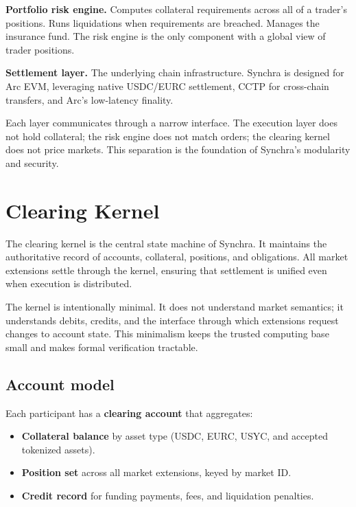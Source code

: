 \documentclass[11pt,a4paper]{article}
\begin{document}
\textbf{Portfolio risk engine.} Computes collateral requirements across all of a trader's positions. Runs liquidations when requirements are breached. Manages the insurance fund. The risk engine is the only component with a global view of trader positions.

\textbf{Settlement layer.} The underlying chain infrastructure. Synchra is designed for Arc EVM, leveraging native USDC/EURC settlement, CCTP for cross-chain transfers, and Arc's low-latency finality.

Each layer communicates through a narrow interface. The execution layer does not hold collateral; the risk engine does not match orders; the clearing kernel does not price markets. This separation is the foundation of Synchra's modularity and security.

\section{Clearing Kernel}
\label{sec:clearing}

The clearing kernel is the central state machine of Synchra. It maintains the authoritative record of accounts, collateral, positions, and obligations. All market extensions settle through the kernel, ensuring that settlement is unified even when execution is distributed.

The kernel is intentionally minimal. It does not understand market semantics; it understands debits, credits, and the interface through which extensions request changes to account state. This minimalism keeps the trusted computing base small and makes formal verification tractable.

\subsection{Account model}

Each participant has a \textbf{clearing account} that aggregates:
\begin{itemize}
  \item \textbf{Collateral balance} by asset type (USDC, EURC, USYC, and accepted tokenized assets).
  \item \textbf{Position set} across all market extensions, keyed by market ID.
  \item \textbf{Credit record} for funding payments, fees, and liquidation penalties.
\end{itemize}
\end{document}
